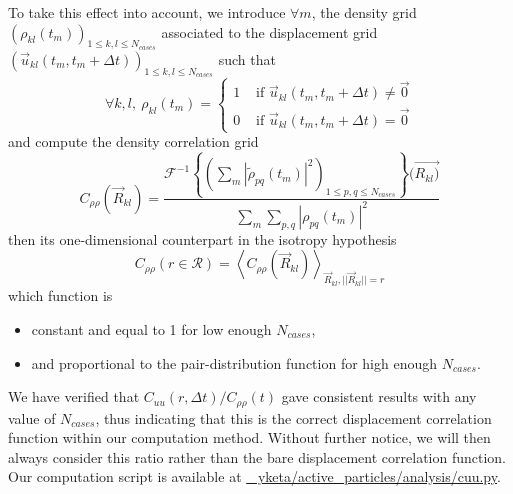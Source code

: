 \documentclass[class=report, float=false, crop=false]{standalone}
\begin{document}
To take this effect into account, we introduce $\forall m$, the density grid $(\rho_{kl}(t_m))_{1 \leq k, l \leq N_{cases}}$ associated to the displacement grid $(\vec{u}_{kl}(t_m, t_m + \Delta t))_{1 \leq k, l \leq N_{cases}}$ such that
\begin{equation}
\forall k, l,~ \rho_{kl}(t_m) = \begin{cases} 1 &\text{ if } \vec{u}_{kl}(t_m, t_m + \Delta t) \neq \vec{0} \\ 0 &\text{ if } \vec{u}_{kl}(t_m, t_m + \Delta t) = \vec{0} \end{cases}
\end{equation}
and compute the density correlation grid
\begin{equation}
C_{\rho\rho}(\vec{R}_{kl}) = \frac{\mathcal{F}^{-1}\left\{\left(\sum_m |\tilde{\rho}_{pq}(t_m)|^2\right)_{1 \leq p, q \leq N_{cases}}\right\}(\vec{R_{kl})}}{\sum_m\sum_{p, q} |\rho_{pq}(t_m)|^2}
\end{equation}
then its one-dimensional counterpart in the isotropy hypothesis
\begin{equation}
C_{\rho\rho}(r \in \mathcal{R}) = \left<C_{\rho\rho}(\vec{R}_{kl})\right>_{\vec{R}_{kl}, ||\vec{R}_{kl}||=r}
\end{equation}
which function is
\begin{itemize}
  \item constant and equal to 1 for low enough $N_{cases}$,
  \item and proportional to the pair-distribution function \cite{binder2011glassy21} for high enough $N_{cases}$.\\
\end{itemize}

We have verified that $C_{uu}(r, \Delta t)/C_{\rho\rho}(t)$ gave consistent results with any value of $N_{cases}$, thus indicating that this is the correct displacement correlation function within our computation method. Without further notice, we will then always consider this ratio rather than the bare displacement correlation function.\\

Our computation script is available at \href{https://github.com/yketa/active_particles/blob/master/analysis/cuu.py}{{\faGithub~ yketa/active\_particles/analysis/cuu.py}}.

\end{document}
